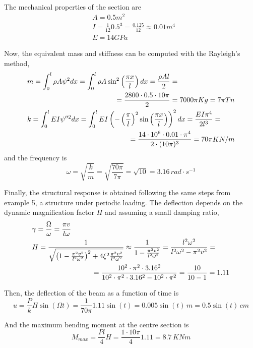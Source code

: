 The mechanical properties of the section are
\begin{align*}
&A = 0.5m^2 \\
&I = \frac{1}{12}0.5^3 = \frac{0.125}{12} \approx 0.01 m^4\\
&E = 14GPa
\end{align*}

Now, the equivalent mass and stiffness can be computed with the Rayleigh's method,
\begin{align*}
&m = \int_0^l \rho A\psi^2dx = \int_0^l \rho A\sin^2\left(\frac{\pi x}{l}\right)dx = \frac{\rho Al}{2} = \\
& \pushright{= \frac{2800 \cdot 0.5 \cdot 10\pi}{2} = 7000\pi Kg = 7\pi Tn} \\
&k = \int_0^l EI\psi''^2dx = \int_0^l EI\left(-\left(\frac{\pi}{l}\right)^2\sin\left(\frac{\pi x}{l}\right)\right)^2dx = \frac{EI\pi^4}{2l^3} = \qquad \\
& \pushright{= \frac{14\cdot 10^6 \cdot 0.01 \cdot \pi^4}{2 \cdot (10\pi)^3} =
70\pi KN/m}
\end{align*}
and the frequency is
$$
\omega = \sqrt{\frac{k}{m}} = \sqrt{\frac{70\pi}{7\pi}} = \sqrt{10} = 3.16\,rad\cdot s^{-1}
$$

Finally, the structural response is obtained following the same steps from example 5, a structure under periodic loading. The deflection depends on the dynamic magnification factor $H$ and assuming a small damping ratio,
\begin{align*}
&\gamma = \frac{\Omega}{\omega} = \frac{\pi v}{l\omega} \\
&H = \frac{1}{\sqrt{\left(1-\frac{\pi^2v^2}{l^2\omega^2}\right)^2 + 4\xi^2\frac{\pi^2v^2}{l^2\omega^2}}} \approx \frac{1}{1-\frac{\pi^2v^2}{l^2\omega^2}} = \frac{l^2\omega^2}{l^2\omega^2-\pi^2v^2} = \qquad \\
&\pushright{= \frac{10^2\cdot\pi^2\cdot 3.16^2}{10^2\cdot\pi^2\cdot 3.16^2 - 10^2\cdot\pi^2}
= \frac{10}{10-1} = 1.11}
\end{align*}

Then, the deflection of the beam as a function of time is
$$
u = \frac{P}{k}H\sin(\Omega t) = \frac{1}{70\pi}1.11\sin(t) = 0.005\sin(t)\,m = 0.5\sin(t)\,cm
$$

And the maximum bending moment at the centre section is
$$
M_{max} = \frac{Pl}{4}H = \frac{1 \cdot 10\pi}{4}1.11 = 8.7\,KNm
$$



